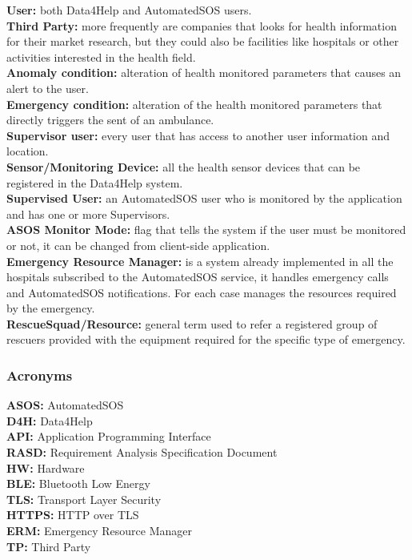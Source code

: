 {{}
{}
\textbf{User:} both Data4Help and AutomatedSOS users.\\
\textbf{Third Party:} more frequently are companies that looks for health information for their market research, but they could also be facilities like hospitals or other activities interested in the health field.  \\ 
\textbf{Anomaly condition:} alteration of health monitored parameters that causes an alert to the user.\\
\textbf{Emergency condition:} alteration of the health monitored parameters that directly triggers the sent of an ambulance.\\
\textbf{Supervisor user:} every user that has access to another user information and location. \\
\textbf{Sensor/Monitoring Device:} all the health sensor devices that can be registered in the Data4Help system.\\
\textbf{Supervised User:} an AutomatedSOS user who is monitored by the application and has one or more Supervisors. \\
\textbf{ASOS Monitor Mode:} flag that tells the system if the user must be monitored or not, it can be changed from client-side application.\\
\textbf{Emergency Resource Manager:} is a system already implemented in all the hospitals subscribed to the AutomatedSOS service, it handles emergency calls and AutomatedSOS notifications. For each case manages the resources required by the emergency. \\
\textbf{RescueSquad/Resource:} general term used to refer a registered group of rescuers provided with the equipment required for the specific type of emergency. 


{\color{Blue}\subsubsection{Acronyms}}
\textbf{ASOS:} AutomatedSOS\\
\textbf{D4H:} Data4Help\\
\textbf{API:} Application Programming Interface\\
\textbf{RASD:} Requirement Analysis Specification Document \\
\textbf{HW:} Hardware\\
\textbf{BLE:} Bluetooth Low Energy\\
\textbf{TLS:} Transport Layer Security\\
\textbf{HTTPS:} HTTP over TLS\\
\textbf{ERM:} Emergency Resource Manager\\
\textbf{TP:} Third Party


}
